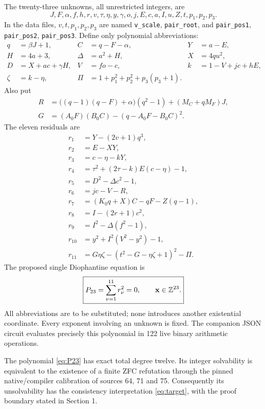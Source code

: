 The twenty-three unknowns, all unrestricted integers, are
\begin{equation}
 J,F,\alpha,f,h,r,v,\tau,\eta,y,\gamma,o,j,E,c,a,I,u,Z,t,p_1,p_2,p_3.
 \label{eq:vars23}
\end{equation}
In the data files, $v,t,p_1,p_2,p_3$ are named
\texttt{v\_scale}, \texttt{pair\_root}, and
\texttt{pair\_pos1}, \texttt{pair\_pos2}, \texttt{pair\_pos3}.
Define only polynomial abbreviations:
\begin{align*}
 q&=\beta J+1,& C&=q-F-\alpha,&Y&=a-E,\\
 H&=4a+3,&\Delta&=a^2+H,&X&=4qu^2,\\
 D&=X+ac+\gamma H,&V&=fo-c,&k&=1-V+jc+hE,\\
 \zeta&=k-\eta,&\Pi&=1+p_1^2+p_2^2+p_3(p_3+1).
\end{align*}
Also put
\begin{align*}
 R&=\bigl((q-1)(q-F)+\alpha\bigr)(q^2-1)+(M_C+qM_F)J,\\
 G&=(A_0F)(B_0C)-(q-A_0F-B_0C)^2.
\end{align*}
The eleven residuals are
\begin{align}
 r_1&=Y-(2v+1)q^3,\nonumber\\
 r_2&=E-XY,\nonumber\\
 r_3&=c-\eta-kY,\nonumber\\
 r_4&=\tau^2+(2\tau-k)E(c-\eta)-1,\nonumber\\
 r_5&=D^2-\Delta c^2-1,\nonumber\\
 r_6&=jc-V-R,\nonumber\\
 r_7&=(K_0q+X)C-qF-Z(q-1),\nonumber\\
 r_8&=I-(2r+1)c^2,\nonumber\\
 r_9&=I^2-\Delta(f^2-1),\nonumber\\
 r_{10}&=y^2+I^2(V^2-y^2)-1,\nonumber\\
 r_{11}&=G\eta\zeta-(t^2-G-\eta\zeta+1)^2-\Pi.
 \label{eq:23residuals}
\end{align}
The proposed single Diophantine equation is
\begin{equation}
 \boxed{\displaystyle P_{23}=\sum_{\nu=1}^{11}r_\nu^2=0,
 \qquad\mathbf x\in\mathbb Z^{23}.}
 \label{eq:P23}
\end{equation}
All abbreviations are to be substituted; none introduces another
existential coordinate. Every exponent involving an unknown is fixed.
The companion JSON circuit evaluates precisely this polynomial in
122 live binary arithmetic operations.

\begin{theorem}
The polynomial \eqref{eq:P23} has exact total degree twelve.
Its integer solvability is equivalent to the existence of a finite ZFC
refutation through the pinned native/compiler calibration of
sources 64, 71 and 75. Consequently its unsolvability has the consistency
interpretation \eqref{eq:target}, with the proof boundary stated in
Section 1.
\end{theorem}

